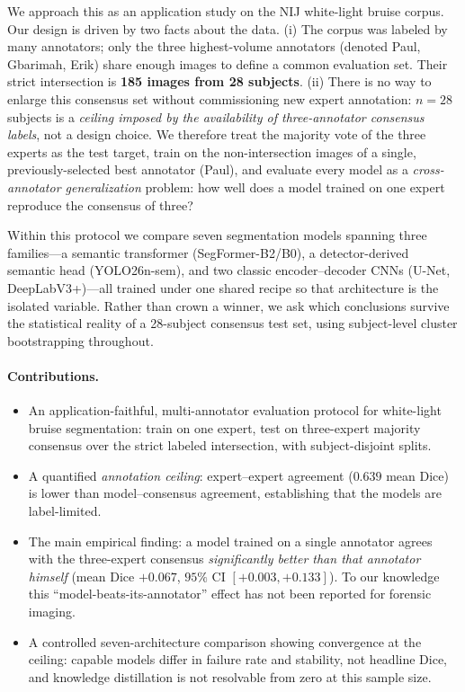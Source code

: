 \documentclass[letterpaper,twocolumn,10pt]{article}
\begin{document}
We approach this as an application study on the NIJ white-light bruise corpus. Our
design is driven by two facts about the data. (i) The corpus was labeled by many
annotators; only the three highest-volume annotators (denoted Paul, Gbarimah,
Erik) share enough images to define a common evaluation set. Their strict
intersection is \textbf{185 images from 28 subjects}. (ii) There is no way to
enlarge this consensus set without commissioning new expert annotation: $n=28$
subjects is a \emph{ceiling imposed by the availability of three-annotator
consensus labels}, not a design choice. We therefore treat the majority vote of
the three experts as the test target, train on the non-intersection images of a
single, previously-selected best annotator (Paul), and evaluate every model as a
\emph{cross-annotator generalization} problem: how well does a model trained on one
expert reproduce the consensus of three?

Within this protocol we compare seven segmentation models spanning three
families---a semantic transformer (SegFormer-B2/B0), a detector-derived semantic
head (YOLO26n-sem), and two classic encoder--decoder CNNs (U-Net, DeepLabV3+)---all
trained under one shared recipe so that architecture is the isolated variable.
Rather than crown a winner, we ask which conclusions survive the statistical
reality of a 28-subject consensus test set, using subject-level cluster
bootstrapping throughout.

\paragraph{Contributions.}
\begin{itemize}\itemsep2pt
\item An application-faithful, multi-annotator evaluation protocol for white-light
bruise segmentation: train on one expert, test on three-expert majority consensus
over the strict labeled intersection, with subject-disjoint splits.
\item A quantified \emph{annotation ceiling}: expert--expert agreement ($0.639$
mean Dice) is lower than model--consensus agreement, establishing that the models
are label-limited.
\item The main empirical finding: a model trained on a single annotator agrees
with the three-expert consensus \emph{significantly better than that annotator
himself} (mean Dice $+0.067$, $95\%$ CI $[+0.003,+0.133]$). To our knowledge this
``model-beats-its-annotator'' effect has not been reported for forensic imaging.
\item A controlled seven-architecture comparison showing convergence at the
ceiling: capable models differ in failure rate and stability, not headline Dice,
and knowledge distillation is not resolvable from zero at this sample size.
\end{itemize}
\end{document}
